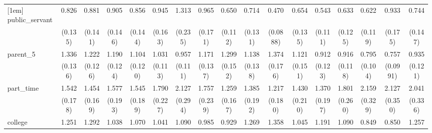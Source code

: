 {\begin{tabular}{l*{16}{c}}
[1em]
public\_servant      &       0.826         &       0.881         &       0.905         &       0.856         &       0.945         &       1.313         &       0.965         &       0.650\sym{*}  &       0.714         &       0.470\sym{***}&       0.654\sym{*}  &       0.543\sym{**} &       0.633\sym{*}  &       0.622\sym{*}  &       0.933         &       0.744         \\
                    &     (0.135)         &     (0.141)         &     (0.146)         &     (0.144)         &     (0.163)         &     (0.235)         &     (0.171)         &     (0.112)         &     (0.131)         &    (0.0888)         &     (0.135)         &     (0.111)         &     (0.125)         &     (0.119)         &     (0.175)         &     (0.147)         \\
[1em]
parent\_5            &       1.336\sym{**} &       1.222         &       1.190         &       1.104         &       1.031         &       0.957         &       1.171         &       1.299\sym{*}  &       1.138         &       1.374\sym{*}  &       1.121         &       0.912         &       0.916         &       0.795         &       0.757\sym{*}  &       0.935         \\
                    &     (0.136)         &     (0.126)         &     (0.124)         &     (0.120)         &     (0.113)         &     (0.111)         &     (0.137)         &     (0.152)         &     (0.138)         &     (0.176)         &     (0.151)         &     (0.123)         &     (0.118)         &     (0.104)         &    (0.0991)         &     (0.121)         \\
[1em]
part\_time           &       1.542\sym{***}&       1.454\sym{**} &       1.577\sym{***}&       1.545\sym{***}&       1.790\sym{***}&       2.127\sym{***}&       1.757\sym{***}&       1.259         &       1.385\sym{*}  &       1.217         &       1.430\sym{*}  &       1.370\sym{*}  &       1.801\sym{***}&       2.159\sym{***}&       2.127\sym{***}&       2.041\sym{***}\\
                    &     (0.178)         &     (0.169)         &     (0.193)         &     (0.189)         &     (0.227)         &     (0.294)         &     (0.239)         &     (0.167)         &     (0.192)         &     (0.180)         &     (0.210)         &     (0.197)         &     (0.260)         &     (0.329)         &     (0.350)         &     (0.336)         \\
[1em]
college             &       1.251         &       1.292         &       1.038         &       1.070         &       1.041         &       1.090         &       0.985         &       0.929         &       1.269         &       1.358         &       1.045         &       1.191         &       1.090         &       0.849         &       0.850         &       1.257         \\

\end{tabular}}

